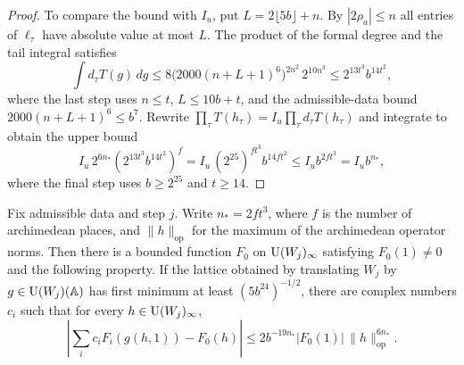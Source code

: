 \begin{proof}
To compare the bound with $I_u$, put $L=2\lfloor5b\rfloor+n$. By $|2\rho_a|\le n$ all entries of $\ell_\tau$ have absolute value at most $L$. The product of the formal degree and the tail integral satisfies
\[
 \int d_\tau T(g)\,dg
 \le 8\bigl(2000(n+L+1)^6\bigr)^{2n^2}\,2^{10n^3}
 \le 2^{13t^3}b^{14t^2},
\]
where the last step uses $n\le t$, $L\le10b+t$, and the admissible-data bound $2000(n+L+1)^6\le b^7$. Rewrite $\prod_\tau T(h_\tau)=I_u\prod_\tau d_\tau T(h_\tau)$ and integrate to obtain the upper bound
\[
   I_u\,2^{6n_*}(2^{13t^3}b^{14t^2})^f
   = I_u\,(2^{25})^{ft^3} b^{14ft^2}
   \le I_u b^{2ft^3}=I_u b^{n_*},
\]
where the final step uses $b\ge2^{25}$ and $t\ge14$.
\end{proof}

\begin{lemma}
\label{lem:c-kernel-choice-approx}
\emitthmsource
Fix admissible data and step $j$. Write $n_*=2ft^3$, where $f$ is the number of archimedean places, and $\|h\|_{\mathrm{op}}$ for the maximum of the archimedean operator norms. Then there is a bounded function $F_0$ on $\operatorname{U}(W_j)_\infty$ satisfying $F_0(1)\ne0$ and the following property. If the lattice obtained by translating $W_j$ by $g\in \operatorname{U}(W_j)(\mathbb A)$ has first minimum at least $(5b^{24})^{-1/2}$, there are complex numbers $c_i$ such that for every $h\in \operatorname{U}(W_j)_\infty$,
\[
 \left|\sum_i c_i F_i(g(h,1))-F_0(h)\right|
 \le 2b^{-19n_*}|F_0(1)|\,\|h\|_{\mathrm{op}}^{6n_*}.
\]
\end{lemma}

